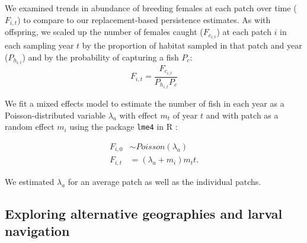 \documentclass[12pt, oneside]{article}   	%
\begin{document}
We examined trends in abundance of breeding females at each patch over time ($F_{i,t}$) to compare to our replacement-based persistence estimates. As with offspring, we scaled up the number of females caught ($F_{c_{i,t}}$) at each patch $i$ in each sampling year $t$ by the proportion of habitat sampled in that patch and year ($P_{h_{i,t}}$) and by the probability of capturing a fish $P_c$:
\begin{equation}
F_{i,t} = \frac{F_{c_{i,t}}}{P_{h_{i,t}}P_c}
\end{equation}

We fit a mixed effects model to estimate the number of fish in each year as a Poisson-distributed variable $\lambda_a$ with effect $m_t$ of year $t$ and with patch as a random effect $m_i$ using the package \texttt{lme4} in R \citep{lme42015package}:

\begin{equation} \label{EQN_Abundance}
\begin{split}
F_{i,0} & \sim Poisson(\lambda_a) \\
F_{i,t} & = (\lambda_a + m_i)m_t t.
\end{split}
\end{equation}

We estimated $\lambda_a$ for an average patch as well as the individual patchs. %


\subsection*{Exploring alternative geographies and larval navigation}
\end{document}
